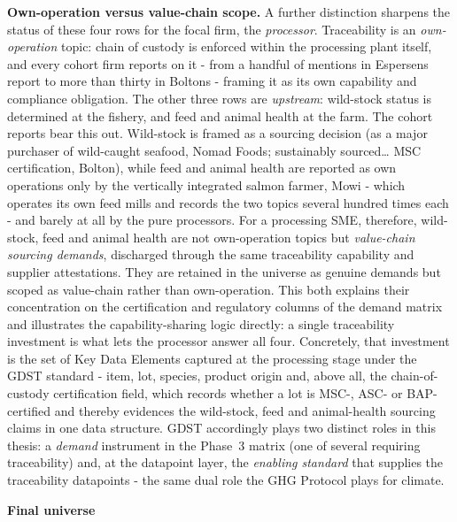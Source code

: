\documentclass[
]{article}
\begin{document}
\textbf{Own-operation versus value-chain scope.} A further distinction
sharpens the status of these four rows for the focal firm, the
\emph{processor}. Traceability is an \emph{own-operation} topic: chain of
custody is enforced within the processing plant itself, and every cohort
firm reports on it - from a handful of mentions in Espersen\textquotesingle s
report to more than thirty in Bolton\textquotesingle s - framing it as
its own capability and compliance obligation. The other three rows are
\emph{upstream}: wild-stock status is determined at the fishery, and feed
and animal health at the farm. The cohort reports bear this out. Wild-stock
is framed as a sourcing decision (\textquotesingle as a major purchaser of
wild-caught seafood\textquotesingle, Nomad Foods; \textquotesingle
sustainably sourced\ldots{} MSC certification\textquotesingle, Bolton),
while feed and animal health are reported as own operations only by the
vertically integrated salmon farmer, Mowi - which operates its own feed
mills and records the two topics several hundred times each - and barely
at all by the pure processors. For a processing SME, therefore, wild-stock,
feed and animal health are not own-operation topics but \emph{value-chain
sourcing demands}, discharged through the same traceability capability and
supplier attestations. They are retained in the universe as genuine demands
but scoped as value-chain rather than own-operation. This both explains
their concentration on the certification and regulatory columns of the
demand matrix and illustrates the capability-sharing logic directly: a
single traceability investment is what lets the processor answer all four.
Concretely, that investment is the set of Key Data Elements captured at the
processing stage under the GDST standard - item, lot, species, product
origin and, above all, the chain-of-custody certification field, which
records whether a lot is MSC-, ASC- or BAP-certified and thereby evidences
the wild-stock, feed and animal-health sourcing claims in one data
structure. GDST accordingly plays two distinct roles in this thesis: a
\emph{demand} instrument in the Phase~3 matrix (one of several requiring
traceability) and, at the datapoint layer, the \emph{enabling standard} that
supplies the traceability datapoints - the same dual role the GHG Protocol
plays for climate.

\textbf{Final universe}
\end{document}
